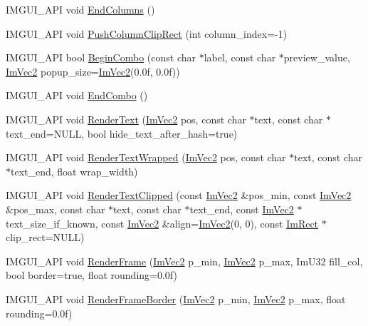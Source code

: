 \begin{DoxyCompactItemize}
\item 
I\+M\+G\+U\+I\+\_\+\+A\+PI void \hyperlink{namespace_im_gui_af93bed3bce5475fe4d525d744f16aa20}{End\+Columns} ()
\item 
I\+M\+G\+U\+I\+\_\+\+A\+PI void \hyperlink{namespace_im_gui_abb20c9f8365cab62d9394ebb1dd5d769}{Push\+Column\+Clip\+Rect} (int column\+\_\+index=-\/1)
\item 
I\+M\+G\+U\+I\+\_\+\+A\+PI bool \hyperlink{namespace_im_gui_a08acc516e0de3cbb99f00774778a440a}{Begin\+Combo} (const char $\ast$label, const char $\ast$preview\+\_\+value, \hyperlink{struct_im_vec2}{Im\+Vec2} popup\+\_\+size=\hyperlink{struct_im_vec2}{Im\+Vec2}(0.\+0f, 0.\+0f))
\item 
I\+M\+G\+U\+I\+\_\+\+A\+PI void \hyperlink{namespace_im_gui_a63434692d7de278875c7ea0143fbe6e4}{End\+Combo} ()
\item 
I\+M\+G\+U\+I\+\_\+\+A\+PI void \hyperlink{namespace_im_gui_a9971ce57f2a288ac3a12df886c5550d1}{Render\+Text} (\hyperlink{struct_im_vec2}{Im\+Vec2} pos, const char $\ast$text, const char $\ast$text\+\_\+end=N\+U\+LL, bool hide\+\_\+text\+\_\+after\+\_\+hash=true)
\item 
I\+M\+G\+U\+I\+\_\+\+A\+PI void \hyperlink{namespace_im_gui_aa483b40f6899e1b289b4bf6c2673d1d2}{Render\+Text\+Wrapped} (\hyperlink{struct_im_vec2}{Im\+Vec2} pos, const char $\ast$text, const char $\ast$text\+\_\+end, float wrap\+\_\+width)
\item 
I\+M\+G\+U\+I\+\_\+\+A\+PI void \hyperlink{namespace_im_gui_ab362eafae794c7364a6b96ea06f38eb9}{Render\+Text\+Clipped} (const \hyperlink{struct_im_vec2}{Im\+Vec2} \&pos\+\_\+min, const \hyperlink{struct_im_vec2}{Im\+Vec2} \&pos\+\_\+max, const char $\ast$text, const char $\ast$text\+\_\+end, const \hyperlink{struct_im_vec2}{Im\+Vec2} $\ast$text\+\_\+size\+\_\+if\+\_\+known, const \hyperlink{struct_im_vec2}{Im\+Vec2} \&align=\hyperlink{struct_im_vec2}{Im\+Vec2}(0, 0), const \hyperlink{struct_im_rect}{Im\+Rect} $\ast$clip\+\_\+rect=N\+U\+LL)
\item 
I\+M\+G\+U\+I\+\_\+\+A\+PI void \hyperlink{namespace_im_gui_a621ba649568ede3939d4f10d83b86d04}{Render\+Frame} (\hyperlink{struct_im_vec2}{Im\+Vec2} p\+\_\+min, \hyperlink{struct_im_vec2}{Im\+Vec2} p\+\_\+max, Im\+U32 fill\+\_\+col, bool border=true, float rounding=0.\+0f)
\item 
I\+M\+G\+U\+I\+\_\+\+A\+PI void \hyperlink{namespace_im_gui_adc76239c2006e66f8dab7638529a763d}{Render\+Frame\+Border} (\hyperlink{struct_im_vec2}{Im\+Vec2} p\+\_\+min, \hyperlink{struct_im_vec2}{Im\+Vec2} p\+\_\+max, float rounding=0.\+0f)

\end{DoxyCompactItemize}
